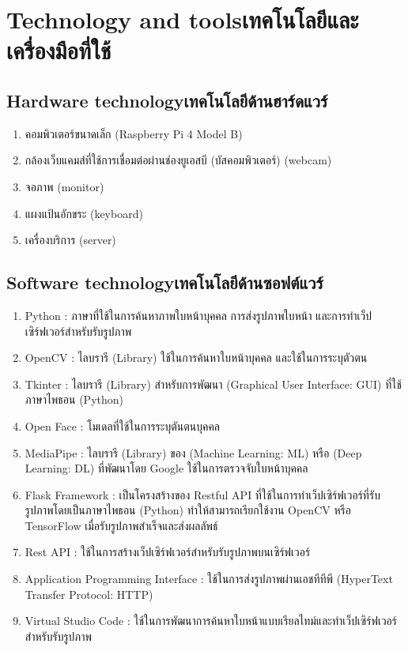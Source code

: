\section{\ifenglish Technology and tools\else เทคโนโลยีและเครื่องมือที่ใช้\fi}
\subsection{\ifenglish Hardware technology\else เทคโนโลยีด้านฮาร์ดแวร์\fi}
\begin{enumerate}
    \item คอมพิวเตอร์ขนาดเล็ก (Raspberry Pi 4 Model B)
    \item กล้องเว็บแคมส์ที่ใช้การเชื่อมต่อผ่านช่องยูเอสบี (บัสคอมพิวเตอร์) (webcam)
    \item จอภาพ (monitor)
    \item แผงแป้นอักขระ (keyboard)
    \item เครื่องบริการ (server)
\end{enumerate}

\subsection{\ifenglish Software technology\else เทคโนโลยีด้านซอฟต์แวร์\fi}
\begin{enumerate}
    \item Python : ภาษาที่ใช้ในการค้นหาภาพใบหน้าบุคคล การส่งรูปภาพใบหน้า และการทำเว็ปเซิร์ฟเวอร์สำหรับรับรูปภาพ
    \item OpenCV : ไลบรารี (Library) ใช้ในการค้นหาใบหน้าบุคคล และใช้ในการระบุตัวตน
    \item Tkinter : ไลบรารี (Library) สำหรับการพัฒนา (Graphical User Interface: GUI) ที่ใช้ภาษาไพธอน (Python)
    \item Open Face : โมเดลที่ใช้ในการระบุตันตนบุคคล
    \item MediaPipe : ไลบรารี (Library) ของ (Machine Learning: ML) หรือ (Deep Learning: DL) ที่พัฒนาโดย Google ใช้ในการตรวจจับใบหน้าบุคคล
    \item Flask Framework : เป็นโครงสร้างของ Restful API ที่ใช้ในการทำเว็ปเซิร์ฟเวอร์ที่รับรูปภาพโดยเป็นภาษาไพธอน (Python) ทำให้สามารถเรียกใช้งาน OpenCV หรือ TensorFlow เมื่อรับรูปภาพสำเร็จและส่งผลลัพธ์
    \item Rest API : ใช้ในการสร้างเว็ปเซิร์ฟเวอร์สำหรับรับรูปภาพบนเซิร์ฟเวอร์
    \item Application Programming Interface : ใช้ในการส่งรูปภาพผ่านเอชทีทีพี (HyperText Transfer Protocol: HTTP)
    \item Virtual Studio Code : ใช้ในการพัฒนาการค้นหาใบหน้าแบบเรียลไทม์และทำเว็ปเซิร์ฟเวอร์สำหรับรับรูปภาพ
    
\end{enumerate}

